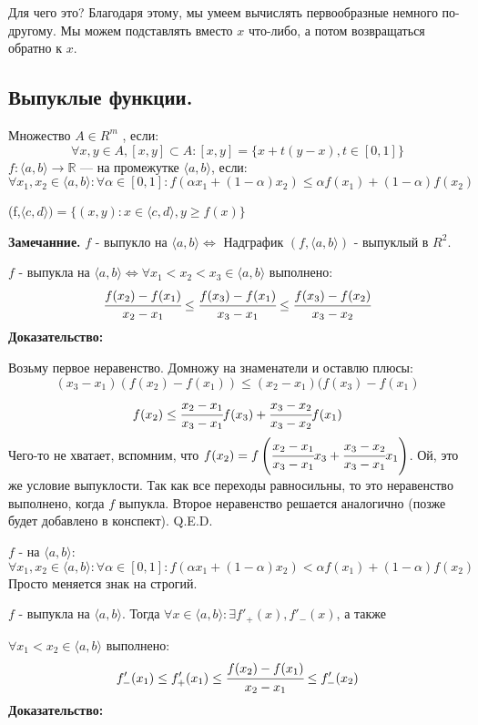 Для чего это? Благодаря этому, мы умеем вычислять первообразные немного по-другому. Мы можем подставлять вместо $x$ что-либо, а потом возвращаться обратно к $x$.

\subsection{Выпуклые функции.}

Множество $A \in R^m$ , если:
$$\forall x,y \in A , [x,y]\subset A: [x,y] = \{x+t(y-x), t\in[0,1]\}$$
 $f:\langle a,b\rangle\rightarrow \mathbb{R}$ ---  на промежутке $\langle a,b\rangle$, если:
$$\forall x_1,x_2 \in \langle a,b \rangle: \forall \alpha \in[0,1]:f(\alpha x_1+(1-\alpha)x_2)\leq \alpha f(x_1) + (1-\alpha) f(x_2)$$

 (f,$\langle c,d \rangle) = \{(x,y): x\in \langle c,d \rangle, y \geq f(x)  \}$

\textbf{Замечанние.} $f$ - выпукло на $\langle a,b\rangle \Leftrightarrow$ Надграфик $(f, \langle a,b \rangle)$ - выпуклый в $R^2$.


$f$ - выпукла на $\langle a,b\rangle \Leftrightarrow \forall x_1<x_2<x_3 \in\langle a,b \rangle$ выполнено:
$$\cfrac{f(x_2)-f(x_1)}{x_2-x_1} \leq \cfrac{f(x_3)-f(x_1)}{x_3-x_1}\leq \cfrac{f(x_3)-f(x_2)}{x_3-x_2}$$
\textbf{Доказательство:}

Возьму первое неравенство. Домножу на знаменатели и оставлю плюсы:
$$(x_3-x_1) (f(x_2)-f(x_1)) \leq (x_2-x_1) (f(x_3)-f(x_1)$$
$$f(x_2)\leq \cfrac{x_2-x_1}{x_3-x_1}f(x_3) + \cfrac{x_3-x_2}{x_3-x_2}f(x_1)$$
Чего-то не хватает, вспомним, что $f(x_2) = f\left (\cfrac{x_2-x_1}{x_3-x_1}x_3 +\cfrac{x_3-x_2}{x_3-x_1}x_1\right)$. Ой, это же условие выпуклости. Так как все переходы равносильны, то 
это неравенство выполнено, когда $f$ выпукла. Второе неравенство решается аналогично (позже будет добавлено в конспект).
\hfill Q.E.D.

$f$ -  на $\langle a,b\rangle$:
$$\forall x_1,x_2 \in \langle a,b \rangle: \forall \alpha \in[0,1]:f(\alpha x_1+(1-\alpha)x_2)< \alpha f(x_1) + (1-\alpha) f(x_2)$$
Просто меняется знак на строгий.


$f$ - выпукла на $\langle a,b \rangle$. Тогда $\forall x\in\langle a,b\rangle: \exists f'_+(x), f'_-(x)$,  а также

$\forall x_1<x_2\in \langle a,b\rangle$ выполнено:
$$f'_-(x_1)\leq f'_+(x_1) \leq \cfrac{f(x_2)-f(x_1)}{x_2-x_1}\leq f'_-(x_2)$$
\textbf{Доказательство:}

